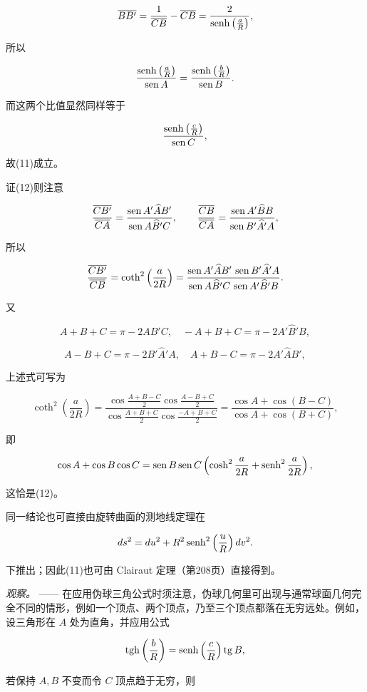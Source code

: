 \[
 \overline{BB'}=\frac1{\overline{CB}}-\overline{CB}=\frac{2}{\operatorname{senh}\left(\frac aR\right)},
\]

所以

\[
 \frac{\operatorname{senh}\left(\frac aR\right)}{\operatorname{sen} A}=\frac{\operatorname{senh}\left(\frac bR\right)}{\operatorname{sen} B}.
\]

而这两个比值显然同样等于

\[
 \frac{\operatorname{senh}\left(\frac cR\right)}{\operatorname{sen} C},
\]

故(11)成立。



证(12)则注意

\[
 \frac{\overline{CB'}}{\overline{CA}}=\frac{\operatorname{sen} A'\widehat A B'}{\operatorname{sen} A\widehat B'C},
 \qquad
 \frac{\overline{CB}}{\overline{CA}}=\frac{\operatorname{sen} A'\widehat B B}{\operatorname{sen} B'\widehat A'A},
\]

所以

\[
 \frac{\overline{CB'}}{\overline{CB}}=\operatorname{coth}^2\left(\frac a{2R}\right)=
 \frac{\operatorname{sen} A'\widehat A B'\,\operatorname{sen} B'\widehat A'A}
 {\operatorname{sen} A\widehat B'C\,\operatorname{sen} A'\widehat B'B}.
\]

又

\[
 A+B+C=\pi-2A\widehat B'C,
 \quad -A+B+C=\pi-2A'\widehat B'B,
\]

\[
 A-B+C=\pi-2B'\widehat A'A,
 \quad A+B-C=\pi-2A'\widehat A B',
\]

上述式可写为

\[
 \coth^2\left(\frac a{2R}\right)=
 \frac{\cos\frac{A+B-C}{2}\cos\frac{A-B+C}{2}}
 {\cos\frac{A+B+C}{2}\cos\frac{-A+B+C}{2}}
 =\frac{\cos A+\cos(B-C)}{\cos A+\cos(B+C)},
\]

即

\[
 \cos A+\cos B\cos C=\operatorname{sen} B\operatorname{sen} C\left(\cosh^2\frac a{2R}+\operatorname{senh}^2\frac a{2R}\right),
\]

这恰是(12)。



同一结论也可直接由旋转曲面的测地线定理在

\[
 ds^2=du^2+R^2\operatorname{senh}^2\left(\frac uR\right)dv^2.
\]

下推出；因此(11)也可由 Clairaut 定理（第208页）直接得到。



\emph{观察。} —— 在应用伪球三角公式时须注意，伪球几何里可出现与通常球面几何完全不同的情形，例如一个顶点、两个顶点，乃至三个顶点都落在无穷远处。例如，设三角形在 $A$ 处为直角，并应用公式

\[
 \operatorname{tgh}\left(\frac bR\right)=\operatorname{senh}\left(\frac cR\right)\operatorname{tg} B,
\]

若保持 $A,B$ 不变而令 $C$ 顶点趋于无穷，则

